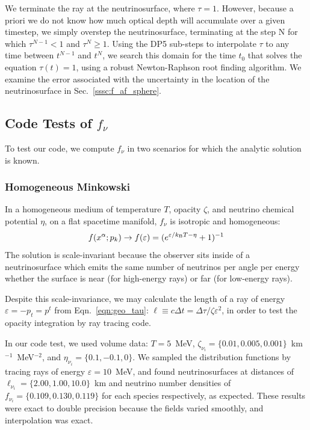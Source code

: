 We terminate the ray at the neutrinosurface, where $\tau=1$.
However, because a priori we do not know how much optical depth will accumulate
over a given timestep, we simply overstep the neutrinosurface, terminating at
the step N for which $\tau^{N-1}<1$ and $\tau^N\geq1$. Using the DP5 sub-steps
to interpolate $\tau$ to any time between $t^{N-1}$ and $t^{N}$, we search
this domain for the time $t_0$ that solves the equation
$\tau(t)=1$, using a robust Newton-Raphson root finding algorithm.
We examine the error associated with the uncertainty in the location of the
neutrinosurface in Sec.~\ref{sssc:f_af_sphere}.

\subsection{Code Tests of $f_\nu$}
\label{ssec:f_tests}
To test our code, we compute $f_\nu$ in two scenarios for which the analytic solution
is known.

\subsubsection{Homogeneous Minkowski}
\label{sssc:f_homo_mink}
In a homogeneous medium of temperature $T$, opacity $\zeta$, and neutrino chemical
potential $\eta$, on a flat spacetime manifold, $f_\nu$ is isotropic and homogeneous:
\begin{equation}
  f(x^\alpha;p_k) \rightarrow f(\varepsilon)
  =(e^{\varepsilon/k_{\rm B}T-\eta}+1)^{-1}
\end{equation}
The solution is scale-invariant because the observer sits inside of a
neutrinosurface which emits the same number of neutrinos per angle per energy
whether the surface is near (for high-energy rays) or far (for low-energy rays).

Despite this scale-invariance, we may calculate the length of a ray of energy
$\varepsilon=-p_t=p^t$ from Eqn.~\ref{eqn:geo_tau}:
$\ell \equiv c\Delta t = \Delta \tau/\zeta\varepsilon^2$, in order to test the
opacity integration by ray tracing code.

In our code test, we used volume data:
$T=5$~MeV,
$\zeta_{\nu_i}=\{0.01,0.005,0.001\}$~km$^{-1}$~MeV$^{-2}$, and
$\eta_{\nu_i}=\{0.1,-0.1,0\}$.
We sampled the distribution functions by tracing rays of energy
$\varepsilon=10$~MeV, and found neutrinosurfaces at distances of
$\ell_{\nu_i}=\{2.00,1.00,10.0\}$~km and neutrino number densities of
$f_{\nu_i}=\{0.109,0.130,0.119\}$ for each species respectively,
as expected. These results were exact to double precision because the fields
varied smoothly, and interpolation was exact.

